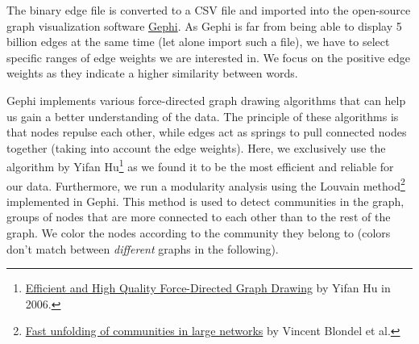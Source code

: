 The binary edge file is converted to a CSV file and imported into the open-source graph visualization software \href{https://gephi.org/}{Gephi}. As Gephi is far from being able to display 5 billion edges at the same time (let alone import such a file), we have to select specific ranges of edge weights we are interested in. We focus on the positive edge weights as they indicate a higher similarity between words.

Gephi implements various force-directed graph drawing algorithms that can help us gain a better understanding of the data. The principle of these algorithms is that nodes repulse each other, while edges act as springs to pull connected nodes together (taking into account the edge weights). Here, we exclusively use the algorithm by Yifan Hu\footnote{\href{http://yifanhu.net/PUB/graph_draw_small.pdf}{Efficient and High Quality Force-Directed Graph Drawing} by Yifan Hu in 2006.} as we found it to be the most efficient and reliable for our data. Furthermore, we run a modularity analysis using the Louvain method\footnote{\href{https://arxiv.org/abs/0803.0476}{Fast unfolding of communities in large networks} by Vincent Blondel et al.} implemented in Gephi. This method is used to detect communities in the graph, \ie groups of nodes that are more connected to each other than to the rest of the graph. We color the nodes according to the community they belong to (colors don't match between \textit{different} graphs in the following).


